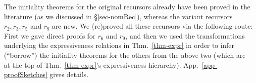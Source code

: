 The initiality theorems for the original recursors already have been proved in the literature (as we discussed in \S\ref{sec-nomRec}), 
%
%
%
%
whereas 
the  variant recursors $r_2,r_3,r_5$ and $r_9$ are new. 
%
We (re)proved all these recursors via the following route: First we gave direct proofs for $r_6$ and $r_9$, and then we used the transformations underlying the expressiveness relations in Thm.~\ref{thm-expr} in order to infer (``borrow'') the initiality theorems for the others from the above two (which are at the top of Thm.~\ref{thm-expr}'s expressiveness hierarchy). 
App.~\ref{app-proofSketches} gives details. 

